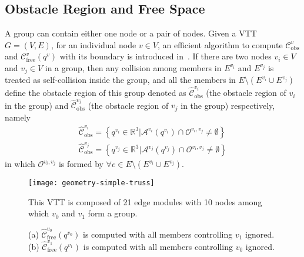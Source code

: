 \documentclass[journal]{IEEEtran}
\begin{document}
\subsection{Obstacle Region and Free Space}
\label{sec:obstacle-free}

A group can contain either one node or a pair of nodes. Given a VTT
$G = (V, E)$, for an individual node $v\in V$, an efficient algorithm
to compute $\mathcal{C}_{\mathrm{obs}}^v$ and
$\mathcal{C}_{\mathrm{free}}^v(q^v)$ with its boundary is introduced
in~\cite{Liu-vtt-cspace-icra-2020}. If there are two nodes $v_i\in V$
and $v_j\in V$ in a group, then any collision among members in
$E^{v_i}$ and $E^{v_j}$ is treated as self-collision inside the group,
and all the members in $E\setminus(E^{v_i}\cup E^{v_j})$ define the
obstacle region of this group denoted as
$\widehat{\mathcal{C}}_{\mathrm{obs}}^{v_i}$ (the obstacle region of
$v_i$ in the group) and $\widehat{\mathcal{C}}_{\mathrm{obs}}^{v_j}$
(the obstacle region of $v_j$ in the group) respectively, namely
\begin{gather*}
  \widehat{\mathcal{C}}_{\mathrm{obs}}^{v_i} = \left\{q^{v_i}\in \mathbb{R}^3\vert
    \mathcal{A}^{v_i}(q^{v_i})\cap \mathcal{O}^{v_i,v_j}\neq \emptyset\right\}\\
  \widehat{\mathcal{C}}_{\mathrm{obs}}^{v_j} = \left\{q^{v_j}\in \mathbb{R}^3\vert
    \mathcal{A}^{v_j}(q^{v_j})\cap \mathcal{O}^{v_i,v_j}\neq \emptyset\right\}
\end{gather*}
in which $\mathcal{O}^{v_i, v_j}$ is formed by
$\forall e\in E\setminus(E^{v_i}\cup E^{v_j})$.

\begin{figure}[b]
  \centering
  \texttt{[image: geometry-simple-truss]}
  \caption{This VTT is composed of 21 edge modules with 10 nodes among
    which $v_0$ and $v_1$ form a group.}
  \label{fig:geometry-truss}
\end{figure}

\begin{figure}[b!]
  \centering
  \hfil
  \caption{(a) $\widehat{\mathcal{C}}_{\mathrm{free}}^{v_0}(q^{v_0})$ is
    computed with all members controlling $v_1$ ignored. (b)
    $\widehat{\mathcal{C}}_{\mathrm{free}}^{v_1}(q^{v_1})$ is computed with all
    members controlling $v_0$ ignored.}
  \label{fig:c-free-group-node}
\end{figure}
\end{document}
